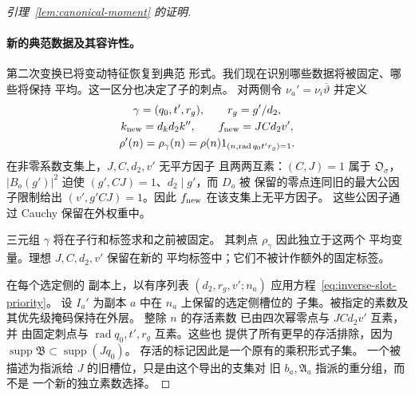 \documentclass[11pt,a4paper]{article}
\numberwithin{equation}{section}
\numberwithin{figure}{section}
\theoremstyle{definition}
\theoremstyle{remark}
\begin{document}
\begin{proof}[引理~\ref{lem:canonical-moment} 的证明]
\paragraph{新的典范数据及其容许性。}
第二次变换已将变动特征恢复到典范
形式。我们现在识别哪些数据将被固定、哪些将保持
平均。这一区分也决定了子的刺点。
对两侧令 \(\nu_a'=\nu_i\overline\vartheta\) 并定义
\begin{equation}\label{eq:canonical-child-data}
 \begin{gathered}
 \gamma=(q_0,t',r_g),\qquad r_g=g'/d_2,\\
 k_{\rm new}=d_kd_2k'',\qquad f_{\rm new}=JCd_2v',\\
 \rho'(n)=\rho_\gamma(n)=\rho(n)1_{(n,\operatorname{rad}q_0t'r_g)=1}.
 \end{gathered}
\end{equation}
在非零系数支集上，\(J,C,d_2,v'\) 无平方因子
且两两互素：\((C,J)=1\) 属于 \(\mathfrak O_\sigma\)，
\(|B_o(g')|^2\) 迫使 \((g',CJ)=1\)、\(d_2\mid g'\)，而 \(D_o\) 被
保留的零点连同旧的最大公因子限制给出
\((v',g'CJ)=1\)。因此 \(f_{\rm new}\) 在该支集上无平方因子。
这些公因子通过 Cauchy 保留在外权重中。

三元组 \(\gamma\) 将在子行和标签求和之前被固定。
其刺点 \(\rho_\gamma\) 因此独立于这两个
平均变量。理想 \(J,C,d_2,v'\) 保留在新的
平均标签中；它们不被计作额外的固定标签。

在每个选定侧的
副本上，以有序列表 \((d_2,r_g,v';n_a)\) 应用方程~\eqref{eq:inverse-slot-priority}。
设 \(I_a'\) 为副本 \(a\) 中在 \(n_a\) 上保留的选定侧槽位的
子集。被指定的素数及其优先级掩码保持在外层。
整除 \(n\) 的存活素数
已由四次幂零点与 \(JCd_2v'\) 互素，并
由固定刺点与 \(\operatorname{rad}q_0,t',r_g\) 互素。这些也
提供了所有更早的存活排除，因为
\(\operatorname{supp}\mathfrak B\subset\operatorname{supp}(Jq_0)\)。
存活的标记因此是一个原有的乘积形式子集。
一个被描述为指派给 \(J\) 的旧槽位，只是由这个导出的支集对
旧 \(b_a,\mathfrak A_a\) 指派的重分组，而不是
一个新的独立素数选择。


\end{proof}
\end{document}
